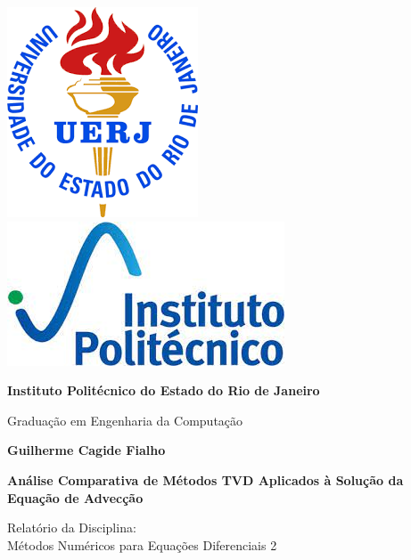 \begin{titlepage}
    \centering

    \includegraphics[height=0.151\textwidth]{header/contra-capa/assets/uerj.png}\hfill
    \includegraphics[height=0.15\textwidth]{header/contra-capa/assets/iprj.jpeg}\hfill

    \vspace{2cm} %

    {\Large\bfseries Instituto Politécnico do Estado do Rio de Janeiro \par}
    \vspace{0.5cm}
    {\large Graduação em Engenharia da Computação \par}

    \vspace{3cm} %

    {\large\bfseries Guilherme Cagide Fialho \par}

    \vspace{1.5cm}

    {\large\bfseries Análise Comparativa de Métodos TVD Aplicados à Solução da Equação de Advecção \par}

    \vspace{1cm} %

    \begin{flushright}
        \begin{minipage}{0.5\textwidth}
            \large
            \raggedleft %
            Relatório da Disciplina: \\
            Métodos Numéricos para Equações Diferenciais 2
        \end{minipage}
    \end{flushright}


\end{titlepage}
